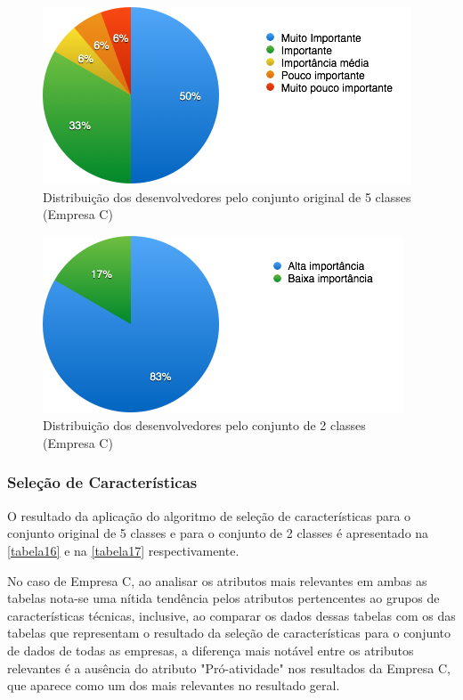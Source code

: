 \begin{figure}[h]
	\centering
	\includegraphics[scale=0.8]{figs/empresa_c/imagem-classe-original.png}
	\caption{\label{fig_15}Distribuição dos desenvolvedores pelo conjunto original de 5 classes (Empresa C)}
\end{figure}

\begin{figure}[h]
	\centering
	\includegraphics[scale=0.8]{figs/empresa_c/imagem-classe-alternativa.png}
	\caption{\label{fig_16}Distribuição dos desenvolvedores pelo conjunto de 2 classes (Empresa C)}
\end{figure}

\subsubsection{Seleção de Características}
O resultado da aplicação do algoritmo de seleção de características para o conjunto original de 5 classes e para o conjunto de 2 classes é apresentado na \autoref{tabela16} e na \autoref{tabela17} respectivamente.

No caso de Empresa C, ao analisar os atributos mais relevantes em ambas as tabelas nota-se uma nítida tendência pelos atributos pertencentes ao grupos de características técnicas, inclusive, ao comparar os dados dessas tabelas com os das tabelas que representam o resultado da seleção de características para o conjunto de dados de todas as empresas, a diferença mais notável entre os atributos relevantes é a ausência do atributo "Pró-atividade" nos resultados da Empresa C, que aparece como um dos mais relevantes no resultado geral.

